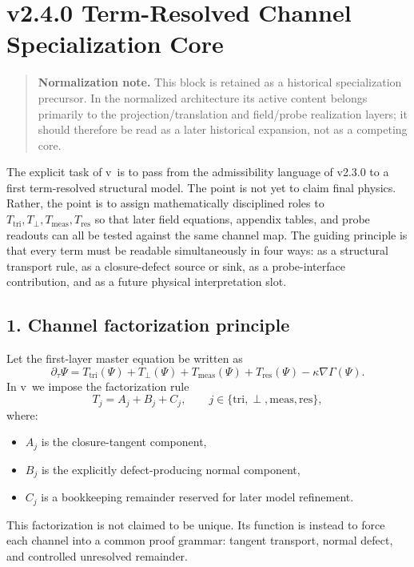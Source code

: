 \section*{v2.4.0 Term-Resolved Channel Specialization Core}
\begin{quote}
\textbf{Normalization note.} This block is retained as a historical specialization precursor. In the normalized architecture its active content belongs primarily to the projection/translation and field/probe realization layers; it should therefore be read as a later historical expansion, not as a competing core.
\end{quote}

The explicit task of v\docversion\ is to pass from the admissibility language of
v2.3.0 to a first term-resolved structural model. The point is not yet to claim
final physics. Rather, the point is to assign mathematically disciplined roles to
\(T_{\mathrm{tri}},T_{\perp},T_{\mathrm{meas}},T_{\mathrm{res}}\) so that later field equations,
appendix tables, and probe readouts can all be tested against the same channel map.
The guiding principle is that every term must be readable simultaneously in four
ways: as a structural transport rule, as a closure-defect source or sink, as a
probe-interface contribution, and as a future physical interpretation slot.

\subsection*{1. Channel factorization principle}
Let the first-layer master equation be written as
\[
\partial_\tau \Psi
= T_{\mathrm{tri}}(\Psi)
+ T_{\perp}(\Psi)
+ T_{\mathrm{meas}}(\Psi)
+ T_{\mathrm{res}}(\Psi)
- \kappa \nabla\Gamma(\Psi).
\]
In v\docversion\ we impose the factorization rule
\[
T_j = A_j + B_j + C_j,
\qquad j\in\{\mathrm{tri},\perp,\mathrm{meas},\mathrm{res}\},
\]
where:
\begin{itemize}
    \item $A_j$ is the closure-tangent component,
    \item $B_j$ is the explicitly defect-producing normal component,
    \item $C_j$ is a bookkeeping remainder reserved for later model refinement.
\end{itemize}
This factorization is not claimed to be unique. Its function is instead to force
each channel into a common proof grammar: tangent transport, normal defect, and
controlled unresolved remainder.

